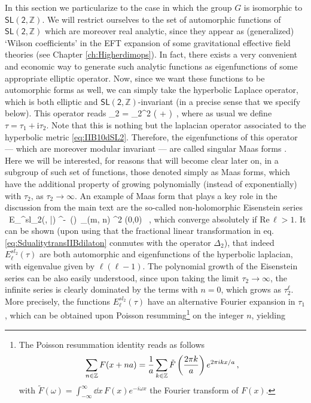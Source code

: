 In this section we particularize to the case in which the group $G$ is isomorphic to $\mathsf{SL(2, \mathbb{Z})}$. We will restrict ourselves to the set of automorphic functions of $\mathsf{SL(2, \mathbb{Z})}$ which are moreover real analytic, since they appear as (generalized) `Wilson coefficients' in the EFT expansion of some gravitational effective field theories (see Chapter \ref{ch:Higherdimops}). In fact, there exists a very convenient and economic way to generate such analytic functions as eigenfunctions of some appropriate elliptic operator. Now, since we want these functions to be automorphic forms as well, we can simply take the hyperbolic Laplace operator, which is both elliptic and $\mathsf{SL(2, \mathbb{Z})}$-invariant (in a precise sense that we specify below). This operator reads
%
\beq\label{eq:SL2Laplacian}
\Delta_2 = \tau_2^2 \left(  + \right)\, ,
\eeq
%
where as usual we define $\tau=\tau_1 + \text{i} \tau_2$. Note that this is nothing but the laplacian operator associated to the hyperbolic metric \eqref{eq:IIB10dSL2}. Therefore, the eigenfunctions of this operator --- which are moreover modular invariant --- are called singular Maas forms \cite{DHoker:2022dxx}. Here we will be interested, for reasons that will become clear later on, in a subgroup of such set of functions, those denoted simply as Maas forms, which have the additional property of growing polynomially (instead of exponentially) with $\tau_2$, as $\tau_2 \to \infty$. An example of Maas form that plays a key role in the discussion from the main text are the so-called non-holomorphic Eisenstein series \cite{DHoker:2022dxx}
%
\beq\label{eq:nonholoEisenstein}
\frac{\Gamma(\ell)}{2\pi^{\ell}}\, E_{\ell}^{sl_2}(\tau, \bar \tau) \equiv \pi^{-\ell}\, \Gamma(\ell)\,  \sum_{(m, n) \in {}^2 \setminus \lbrace (0,0) \rbrace} \, ,
\eeq
%
which converge absolutely if $\text{Re}\, \ell >1$. It can be shown (upon using that the fractional linear transformation in eq. \eqref{eq:SdualitytransIIBdilaton} conmutes with the operator $\Delta_2$), that indeed $E_{\ell}^{sl_2}(\tau)$ are both automorphic and eigenfunctions of the hyperbolic laplacian, with eigenvalue given by $\ell(\ell-1)$. The polynomial growth of the Eisenstein series can be also easily understood, since upon taking the limit $\tau_2 \to \infty$, the infinite series is clearly dominated by the terms with $n=0$, which grows as $\tau_2^\ell$. More precisely, the functions $E_{\ell}^{sl_2}(\tau)$ have an alternative Fourier expansion in $\tau_1$, which can be obtained upon Poisson resumming\footnote{\label{fnote:Poissonresummation}The Poisson resummation identity reads as follows \begin{equation}
    \notag \sum_{n \in \mathbb{Z}} F(x+na) = \frac{1}{a} \sum_{k \in \mathbb{Z}} \tilde{F} \left(\frac{2\pi k}{a} \right) e^{2\pi i k x/a}\, ,
\end{equation}
with $\tilde{F} (\omega)=\int_{-\infty}^{\infty} \dd x\, F(x) e^{-i \omega x}$ the Fourier transform of $F(x)$.} on the integer $n$, yielding
